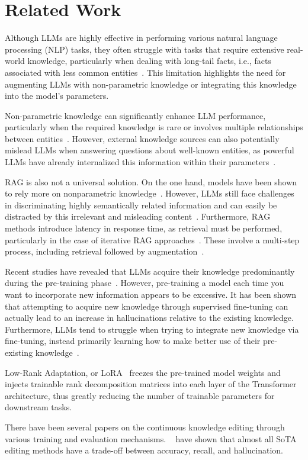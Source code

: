 \section{Related Work}
Although LLMs are highly effective in performing various natural language processing (NLP) tasks, they often struggle with tasks that require extensive real-world knowledge, particularly when dealing with long-tail facts, i.e., facts associated with less common entities~\cite{DBLP:conf/naacl/SunXZLD24-Head-to-Tail}. This limitation highlights the need for augmenting LLMs with non-parametric knowledge or integrating this knowledge into the model's parameters.

Non-parametric knowledge can significantly enhance LLM performance, particularly when the required knowledge is rare or involves multiple relationships between entities~\cite{huang2024prompting}.  However, external knowledge sources can also potentially mislead LLMs when answering questions about well-known entities, as powerful LLMs have already internalized this information within their parameters~\cite{popqa}.

RAG is also not a universal solution. %
On the one hand, models have been shown to rely more on nonparametric knowledge~\cite{DBLP:conf/emnlp/FarahaniJ24}. However, LLMs still face challenges in discriminating highly semantically related information and can easily be distracted by this irrelevant and misleading content~\cite{DBLP:journals/corr/abs-2404-03302}. Furthermore, RAG methods introduce latency in response time, as retrieval must be performed, particularly in the case of iterative RAG approaches~\cite{role}. These involve a multi-step process, including retrieval followed by augmentation~\cite{krayko-etal-2024-efficient}.


Recent studies have revealed that LLMs acquire their knowledge predominantly during the pre-training phase~\cite{allenzhu2024physicslanguagemodels32}. However, pre-training a model each time you want to incorporate new information appears to be excessive. It has been shown that attempting to acquire new knowledge through supervised fine-tuning can actually lead to an increase in hallucinations relative to the existing knowledge. Furthermore, LLMs tend to struggle when trying to integrate new knowledge via fine-tuning, instead primarily learning how to make better use of their pre-existing knowledge~\cite{roee}. 

Low-Rank Adaptation, or LoRA~\cite{DBLP:journals/corr/abs-2106-09685-LoRA} freezes the pre-trained model weights and injects trainable rank decomposition matrices into each layer of the Transformer architecture, thus greatly reducing the number of trainable parameters for downstream tasks.

There have been several papers on the continuous knowledge editing through various training and evaluation mechanisms. ~\citet{wang2024wiserethinkingknowledgememory} have shown that almost all SoTA editing methods have a trade-off between accuracy, recall, and hallucination.